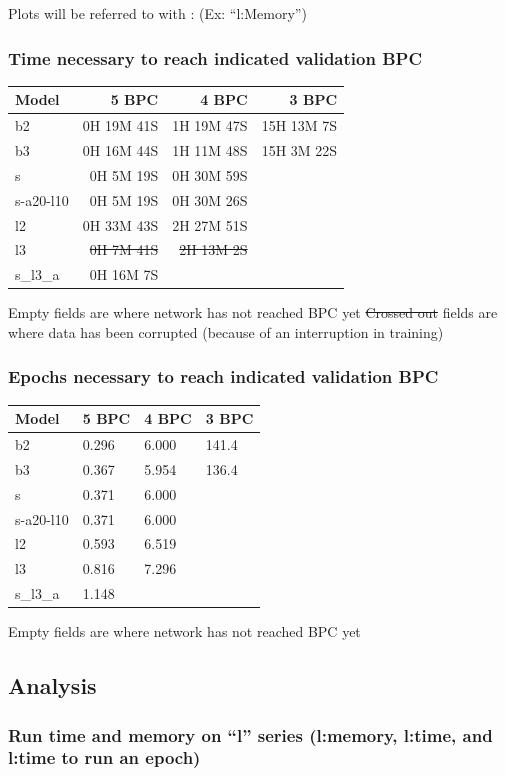 Plots will be referred to with : (Ex: ``l:Memory'')

\subsubsection{Time necessary to reach indicated validation
BPC}

\begin{longtable}[]{@{}lrrr@{}}
\hline
Model & 5 BPC & 4 BPC & 3 BPC\tabularnewline
\hline
\endhead
b2 & 0H 19M 41S & 1H 19M 47S & 15H 13M 7S\tabularnewline
b3 & 0H 16M 44S & 1H 11M 48S & 15H 3M 22S\tabularnewline
s & 0H 5M 19S & 0H 30M 59S &\tabularnewline
s-a20-l10 & 0H 5M 19S & 0H 30M 26S &\tabularnewline
l2 & 0H 33M 43S & 2H 27M 51S &\tabularnewline
l3 & \sout{0H 7M 41S} & \sout{2H 13M 2S} &\tabularnewline
s\_l3\_a & 0H 16M 7S & &\tabularnewline
\hline
\end{longtable}

Empty fields are where network has not reached BPC yet \sout{Crossed
out} fields are where data has been corrupted (because of an
interruption in training)

\subsubsection{Epochs necessary to reach indicated validation
BPC}

\begin{longtable}[]{@{}llll@{}}
\hline
Model & 5 BPC & 4 BPC & 3 BPC\tabularnewline
\hline
\endhead
b2 & 0.296 & 6.000 & 141.4\tabularnewline
b3 & 0.367 & 5.954 & 136.4\tabularnewline
s & 0.371 & 6.000 &\tabularnewline
s-a20-l10 & 0.371 & 6.000 &\tabularnewline
l2 & 0.593 & 6.519 &\tabularnewline
l3 & 0.816 & 7.296 &\tabularnewline
s\_l3\_a & 1.148 & &\tabularnewline
\hline
\end{longtable}

Empty fields are where network has not reached BPC yet

\subsection{Analysis}\label{analysis}

\subsubsection{\texorpdfstring{Run time and memory on ``l'' series
(l:memory, l:time, and l:time to run an
epoch)}{Run time and memory on l series (l:memory, l:time, and l:time to run an epoch)}}

